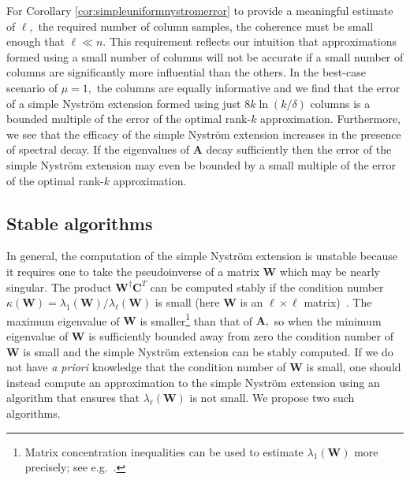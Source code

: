 \documentclass[11pt,letterpaper,twoside,reqno,nosumlimits]{amsart}
\def\pinv{\dagger}
\def\transp{T}
\newcommand{\mat}[1]{\ensuremath{\mathbf{#1}}}
\theoremstyle{remark}
\begin{document}
For Corollary \ref{cor:simpleuniformnystromerror} to provide a meaningful estimate of $\ell,$ the required number of column samples, the coherence must be small enough that $\ell \ll n.$ This requirement reflects our intuition that approximations formed using a small number of columns will not be accurate if a small number of columns are significantly more influential than the others. In the best-case scenario of $\mu=1,$ the columns are equally informative and we find that the error of a simple Nystr\"om extension formed using just $8 k \ln (k/\delta)$ columns is a bounded multiple of the error of the optimal rank-$k$ approximation. Furthermore, we see that the efficacy of the simple Nystr\"om extension increases in the presence of spectral decay. If the eigenvalues of $\mat{A}$ decay sufficiently then the error of the simple Nystr\"om extension may even be bounded by a small multiple of the error of the optimal rank-$k$ approximation.

\subsection{Stable algorithms}
\label{sec:stablealgs}
In general, the computation of the simple Nystr\"om extension is unstable because it requires one to take the pseudoinverse of a matrix $\mat{W}$ which may be nearly singular. The product $\mat{W}^\pinv \mat{C}^\transp$ can be computed stably if the condition number $\kappa(\mat{W}) = \lambda_1(\mat{W})/\lambda_\ell(\mat{W})$ is small (here $\mat{W}$ is an $\ell\times\ell$ matrix)~\cite{GL96}. The maximum eigenvalue of $\mat{W}$ is smaller\footnote{Matrix concentration inequalities can be used to estimate $\lambda_1(\mat{W})$ more precisely; see e.g.~\cite{T10,MJCFT12}.} than that of $\mat{A},$ so when the minimum eigenvalue of $\mat{W}$ is sufficiently bounded away from zero the condition number of $\mat{W}$ is small and the simple Nystr\"om extension can be stably computed. If we do not have \emph{a priori} knowledge that the condition number of $\mat{W}$ is small, one should instead compute an approximation to the simple Nystr\"om extension using an algorithm that ensures that $\lambda_\ell(\mat{W})$ is 
not small. We propose two such algorithms.
\end{document}
